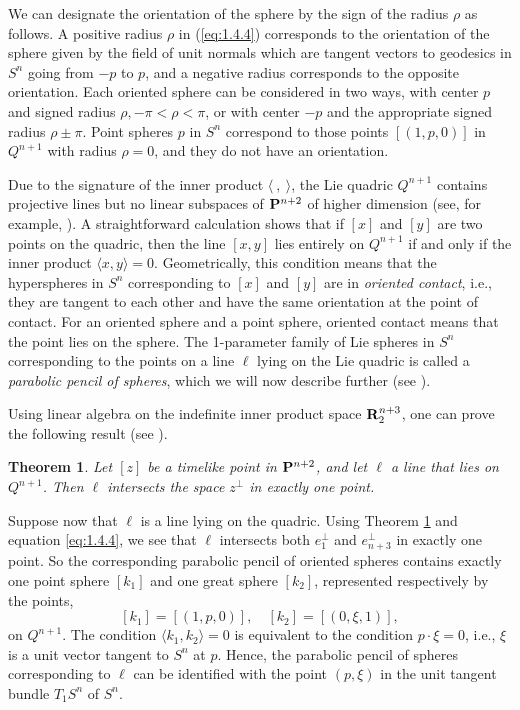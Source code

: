 \documentclass[12pt]{article}
\newtheorem{theorem}{Theorem}[section]
\begin{document}
We can designate the orientation of the sphere by the sign of the radius
$\rho$ as follows.  A positive radius $\rho$ in 
(\ref{eq:1.4.4}) corresponds to the orientation of the sphere given by 
the field of unit normals which are tangent vectors to geodesics in $S^n$ 
going from $-p$ to $p$, and a negative radius corresponds
to the opposite orientation.
Each oriented sphere can be considered in two ways, with center $p$ and signed radius $\rho, - \pi < \rho < \pi$,
or with center $-p$ and the appropriate signed radius $\rho \pm \pi$.
Point spheres $p$ in $S^n$ correspond to those points $[(1, p, 0)]$ in $Q^{n+1}$ with radius $\rho = 0$, and they do not have an orientation.

Due to the signature of the inner product $\langle \ ,\ \rangle$, the
Lie quadric $Q^{n+1}$ contains projective lines but no linear
subspaces of ${\bf P}^{n+2}$ of higher dimension (see, for example, \cite[p. 21]{Cec1}).  
A straightforward calculation
shows that if $[x]$ and $[y]$ are two points on the quadric, 
then the line $[x,y]$ 
lies entirely on $Q^{n+1}$ if and only if the inner product $\langle x,y \rangle=0$.  Geometrically,
this condition means that the hyperspheres in $S^n$ corresponding
to $[x]$ and $[y]$ are in {\em oriented contact}, i.e., they are tangent to each other
and have the same orientation at the point of contact.
For an oriented sphere and a point sphere, oriented contact means that the point lies on the sphere.
The 1-parameter family
of Lie spheres  in $S^n$ corresponding to the points on a line $\ell$ lying on the Lie quadric is called a 
{\em parabolic pencil of spheres}, which we will now describe further (see \cite[pp. 19--23]{Cec1}).

Using linear algebra on the indefinite inner product space ${\bf R}^{n+3}_2$, one can prove the following result
(see \cite[p. 22]{Cec1}).
\begin{theorem}
\label{cor:1.5.5} 
Let $[z]$ be a timelike point in ${\bf P}^{n+2}$, and let $\ell$ a line that lies on $Q^{n+1}$.  Then $\ell$
intersects the space $z^\perp$ in exactly one point.
\end{theorem}
 
 
 
Suppose now that $\ell$ is a line lying on the
quadric.  Using Theorem \ref{cor:1.5.5} and equation \eqref{eq:1.4.4}, we see that $\ell$ intersects both
$e_1^\perp$ and $e_{n+3}^\perp$ in exactly one point.  So the corresponding 
parabolic pencil of oriented spheres contains exactly
one point sphere  $[k_1]$ and one great sphere $[k_2]$, represented respectively by the points,
\begin{equation}
\label{eq:point-sphere-great-sphere} 
[k_1] = [(1,p,0)], \quad [k_2] = [(0,\xi,1)],
\end{equation}
on $Q^{n+1}$.  The condition $\langle k_1, k_2 \rangle = 0$ is equivalent to the condition $p \cdot \xi = 0$, i.e., $\xi$
is a unit vector tangent to $S^n$ at $p$.  Hence, the parabolic pencil of spheres corresponding to $\ell$ can
be identified with the point $(p, \xi)$ in  the unit tangent bundle $T_1S^n$ of $S^n$.  
\end{document}
